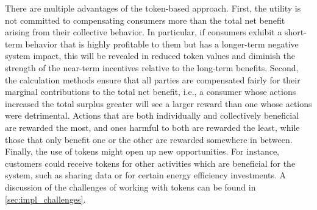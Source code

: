 There are multiple advantages of the token-based approach. 
First, the utility is not committed to compensating consumers more than the total net benefit arising from their collective behavior. In particular, if consumers exhibit a short-term behavior that is highly profitable to them but has a longer-term negative system impact, this will be revealed in reduced token values and diminish the strength of the near-term incentives relative to the long-term benefits.  
Second, the calculation methods ensure that all parties are compensated fairly for their marginal contributions to the total net benefit, i.e., a consumer whose actions increased the total surplus greater will see a larger reward than one whose actions were detrimental. Actions that are both individually and collectively beneficial are rewarded the most, and ones harmful to both are rewarded the least, while those that only benefit one or the other are rewarded somewhere in between.  
Finally, the use of tokens might open up new opportunities. For instance, customers could receive tokens for other activities which are beneficial for the system, such as sharing data or for certain energy efficiency investments.
A discussion of the challenges of working with tokens can be found in \cref{sec:impl_challenges}.

